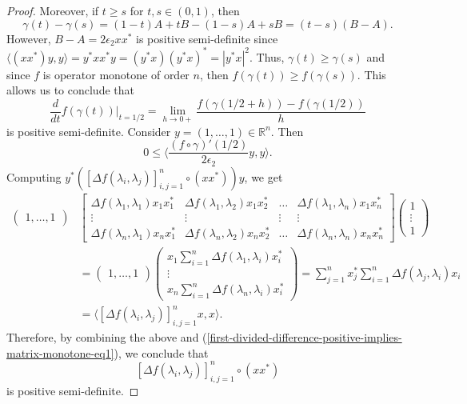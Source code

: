 \documentclass[12pt,a4paper]{amsart}
\theoremstyle{definition}
\newcommand{\myinnerproduct}[2]{ \langle #1, #2 \rangle }
\newcommand{\myabs}[1]{ | #1 | }
\begin{document}
\begin{proof}
		
		
		Moreover, if $t \geq s$ for $t, s \in (0,1)$, then 
		\[  \gamma(t) - \gamma(s) =  (1-t)A + tB - (1-s)A + sB   = (t-s)(B-A).  \]
		However, $B-A = 2 \epsilon_2 xx^{*}$ is positive semi-definite since $\myinnerproduct{(xx^{*})y}{y} = y^{*}xx^{*}y = (y^{*}x)(y^{*}x)^{*} = \myabs{y^{*}x}^{2}$. Thus,  $\gamma(t) \geq \gamma(s)$ and since $f$ is operator monotone of order $n$, then $f(\gamma(t)) \geq f(\gamma(s))$. This allows us to conclude that
		\[ \frac{d}{dt} f(\gamma(t)) \vert_{t=1/2} = \lim_{h \rightarrow 0+} \frac{f(\gamma(1/2 + h)) - f(\gamma(1/2))}{h} \]
		is positive semi-definite. Consider $y = (1, \ldots, 1) \in \mathbb{R}^{n}$. Then 
		\begin{equation}\label{first-divided-difference-positive-implies-matrix-monotone-eq1}
			0 \leq \bigg \langle \frac{(f \circ \gamma)'(1/2)}{2 \epsilon_2} y, y  \bigg \rangle . 
		\end{equation}
		Computing $y^{*}([\Delta f(\lambda_i, \lambda_j)]_{i,j=1}^{n} \circ (x x^{*}))y$, we get
		\begin{align*}
			\begin{pmatrix}
				1, \ldots, 1
			\end{pmatrix} 
			&\begin{bmatrix}
				\Delta f(\lambda_1, \lambda_1) x_1 x^{*}_1 & \Delta f(\lambda_1, \lambda_2) x_1 x^{*}_2 & \ldots & \Delta f(\lambda_1, \lambda_n) x_1 x^{*}_n \\
				\vdots & \vdots & \vdots & \vdots \\
				\Delta f(\lambda_n, \lambda_1) x_n x^{*}_1 & \Delta f(\lambda_n, \lambda_2) x_n x^{*}_2 & \ldots & \Delta f(\lambda_n, \lambda_n) x_n x^{*}_n
			\end{bmatrix}
			\begin{pmatrix}
				1 \\
				\vdots \\
				1
			\end{pmatrix} 
			\\
			&= 		
			\begin{pmatrix}
				1, \ldots, 1
			\end{pmatrix} 
			\begin{pmatrix}
				x_1 \sum_{i=1}^{n} \Delta f(\lambda_1, \lambda_i) x^{*}_i \\
				\vdots \\
				x_n \sum_{i=1}^{n} \Delta f(\lambda_n, \lambda_i) x^{*}_i
			\end{pmatrix} 
			= \sum_{j=1}^{n} x^{*}_j \sum_{i=1}^{n} \Delta f(\lambda_j, \lambda_i) x_i
			\\
			&= \myinnerproduct{[\Delta f(\lambda_i, \lambda_j)]_{i,j=1}^{n} x}{x}.
		\end{align*}		
		Therefore, by combining the above and (\ref{first-divided-difference-positive-implies-matrix-monotone-eq1}), we conclude that \[[\Delta f(\lambda_i, \lambda_j)]_{i,j=1}^{n} \circ (x x^{*}) \] is positive semi-definite.
	\end{proof}
	
\end{document}
